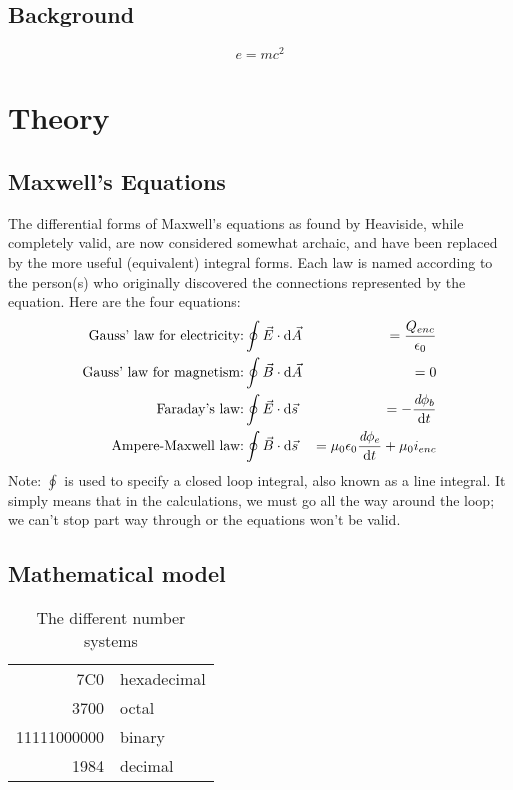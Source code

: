 \documentclass[%
project,    %
]{USN-MSc}
\begin{document}
\section{Background}
\label{sec:back}
\lipsum[4]
\begin{equation}
  e = m c^2
\end{equation}
\lipsum

\chapter{Theory}
\label{ch:theory}

\section{Maxwell's Equations}
\label{sec:theory}
\indent The differential forms of Maxwell's equations as found by Heaviside, while completely valid, are now considered somewhat archaic, and have been replaced by the more useful (equivalent) integral forms. Each law is named according to the person(s) who originally discovered the connections represented by the equation. Here are the four equations:
\begin{eqnarray}
  \text{Gauss' law for electricity:}& \displaystyle \oint{\vec{E}\cdot\mathrm{d}\vec{A}}&=\frac{Q_{enc}}{\epsilon_0}\\
  \text{Gauss' law for magnetism:}& \displaystyle \oint{\vec{B}\cdot\mathrm{d}\vec{A}}&=0\\
  \text{Faraday's law:}& \displaystyle\oint{\vec{E}\cdot\mathrm{d}\vec{s}}&=-\frac{\emph{d}\phi_b}{\mathrm{d}t}\\
  \text{Ampere-Maxwell law:}& \displaystyle\oint{\vec{B}\cdot\mathrm{d}\vec{s}}&=\mu_0\epsilon_0\frac{\emph{d}\phi_e}{\mathrm{d}t}+\mu_0 i_{enc}
\end{eqnarray}
Note: $\oint$ is used to specify a closed loop integral, also known as a line integral. It simply means that in the calculations, we must go all the way around the loop; we can't stop part way through or the equations won't be valid.

\section{Mathematical model}
\label{sec:mathmodel}
\lipsum[8]
\begin{table}[!ht]
  \caption{The different number systems}
  \centering
  \begin{tabular}{|r|l|}
    \hline
    7C0 & hexadecimal \\
    3700 & octal \\ \cline{2-2}
    11111000000 & binary \\
    \hline \hline
    1984 & decimal \\
    \hline
  \end{tabular}
\end{table}
\end{document}

